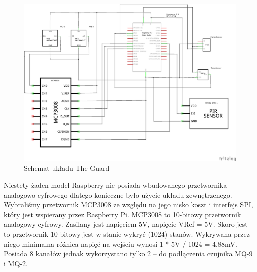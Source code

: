 \begin{figure}[h]
	\centering
	\includegraphics[width=15cm]{GuardSchem}
	\caption{Schemat układu The Guard}
\end{figure}

Niestety żaden model Raspberry nie posiada wbudowanego przetwornika analogowo cyfrowego dlatego konieczne było użycie układu zewnętrzenego. Wybraliśmy przetwornik MCP3008 ze względu na jego nisko koszt i interfejs SPI, który jest wspierany przez Raspberry Pi.
MCP3008 to 10-bitowy przetwornik analogowy cyfrowy. Zasilany jest napięciem 5V, napięcie VRef = 5V.  Skoro jest to przetwornik 10-bitowy jest w stanie wykryć (1024) stanów. Wykrywana przez niego minimalna różnica napięć na wejściu wynosi 1 * 5V / 1024 = 4.88mV.
Posiada 8 kanałów jednak wykorzystano tylko 2 – do podłączenia czujnika MQ-9 i MQ-2.

